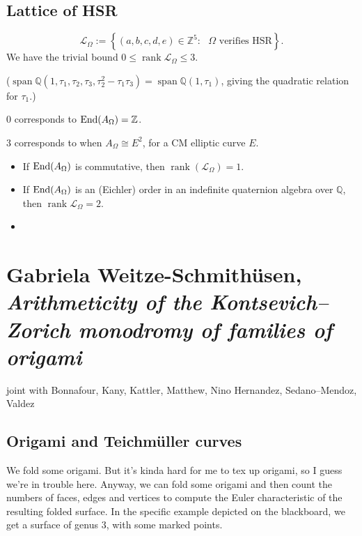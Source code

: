 \documentclass[reqno]{amsart} 
\numberwithin{theorem}{section}
\numberwithin{equation}{section}
\begin{document}
\subsection{Lattice of HSR}

\begin{equation*}
  \mathcal{L}_\Omega := \left\{(a,b,c,d,e) \in \mathbb{Z}^5 : \text{ $\Omega$ verifies HSR} \right\}.
\end{equation*}
We have the trivial bound $0 \leq \operatorname{rank} \mathcal{L}_\Omega \leq 3$.

($\operatorname{span} \mathbb{Q}(1, \tau_1, \tau_2, \tau_3, \tau_2^2 - \tau_1 \tau_3) = \operatorname{span} \mathbb{Q}(1, \tau_1)$, giving the quadratic relation for $\tau_1$.)

$0$ corresponds to $\operatorname{End}(A_\Omega) = \mathbb{Z}$.

$3$ corresponds to when $A_\Omega \cong E^2$, for a CM elliptic curve $E$.

\begin{proposition}
  \begin{itemize}
  \item If $\operatorname{End}(A_\Omega)$ is commutative, then $\operatorname{rank}(\mathcal{L}_\Omega) = 1$.
  \item If $\operatorname{End}(A_\Omega)$ is an (Eichler) order in an indefinite quaternion algebra over $\mathbb{Q}$, then $\operatorname{rank} \mathcal{L}_\Omega = 2$.
  \item
  \end{itemize}
\end{proposition}

\section{Gabriela Weitze-Schmithüsen, \emph{Arithmeticity of the Kontsevich--Zorich monodromy of families of origami}}

joint with Bonnafour, Kany, Kattler, Matthew, Nino Hernandez, Sedano--Mendoz, Valdez

\subsection{Origami and Teichm\"uller curves}

We fold some origami.  But it's kinda hard for me to tex up origami, so I guess we're in trouble here.  Anyway, we can fold some origami and then count the numbers of faces, edges and vertices to compute the Euler characteristic of the resulting folded surface.  In the specific example depicted on the blackboard, we get a surface of genus $3$, with some marked points.
\end{document}
